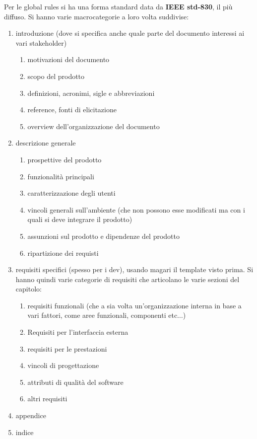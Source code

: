 \documentclass[a4paper,12pt, oneside]{book}
\begin{document}
Per le global rules si ha una forma standard data da \textbf{IEEE std-830}, il
più diffuso. Si hanno varie macrocategorie a loro volta suddivise:
\begin{enumerate}
  \item introduzione (dove si specifica anche quale parte del documento
  interessi ai vari stakeholder)
  \begin{enumerate}
    \item motivazioni del documento
    \item scopo del prodotto
    \item definizioni, acronimi, sigle e abbreviazioni
    \item reference, fonti di elicitazione
    \item overview dell'organizzazione del documento
  \end{enumerate}
  \item descrizione generale
  \begin{enumerate}
    \item prospettive del prodotto
    \item funzionalità principali
    \item caratterizzazione degli utenti
    \item vincoli generali sull'ambiente (che non possono esse modificati ma con
    i quali si deve integrare il prodotto)
    \item assunzioni sul prodotto e dipendenze del prodotto
    \item ripartizione dei requisti
  \end{enumerate}
  \item requisiti specifici (spesso per i dev), usando magari il template visto
  prima. Si hanno quindi varie categorie di requisiti che articolano le varie
  sezioni del capitolo:
  \begin{enumerate}
    \item requisiti funzionali (che a sia volta un'organizzazione interna in
    base a vari fattori, come aree funzionali, componenti etc$\ldots$)
    \item Requisiti per l'interfaccia esterna
    \item requisiti per le prestazioni
    \item vincoli di progettazione
    \item attributi di qualità del software
    \item altri requisiti
  \end{enumerate}
  \item appendice
  \item indice
\end{enumerate}
\end{document}
